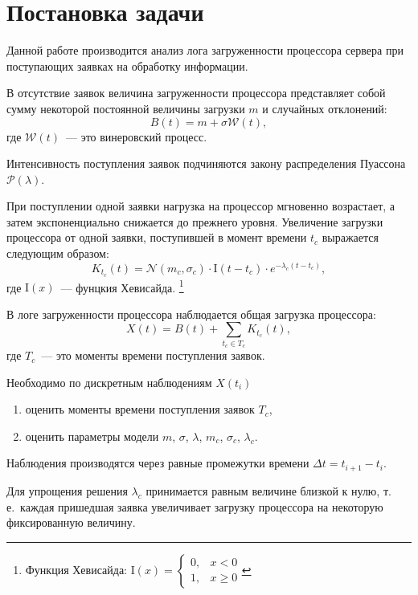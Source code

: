 \documentclass[a4paper,10pt]{article}
\begin{document}



\section{Постановка задачи}
Данной работе производится анализ лога загруженности процессора сервера
при поступающих заявках на обработку информации.

В отсутствие заявок величина загруженности процессора представляет собой 
сумму некоторой постоянной величины загрузки $m$ и случайных отклонений:
$$B(t) = m + \sigma \mathcal{W}(t),$$
где $\mathcal{W}(t)$~--- это винеровский процесс.

Интенсивность поступления заявок подчиняются закону
распределения Пуассона $\mathcal{P}(\lambda)$.

При поступлении одной заявки нагрузка на процессор мгновенно возрастает,
а затем экспоненциально снижается до прежнего уровня.
Увеличение загрузки процессора от одной заявки, 
поступившей в момент времени $t_c$ выражается следующим образом:
$$K_{t_c}(t) = \mathcal{N}(m_c, \sigma_c) \cdot \mathrm{I}(t - t_c) \cdot 
    e^{-\lambda_c(t - t_c)},$$
где $\mathrm{I}(x)$~--- фунцкия Хевисайда.%
\footnote{
Функция Хевисайда: $\mathrm{I}(x) = \left\{
  \begin{array}{rl}
    0, & x < 0 \\
    1, & x \geqslant 0
  \end{array}\right.$
}

В логе загруженности процессора наблюдается общая загрузка процессора:
$$X(t) = B(t) + \sum\limits_{t_c \in T_c}K_{t_c}(t),$$
где $T_c$~--- это моменты времени поступления заявок.

Необходимо по дискретным наблюдениям $X(t_i)$
\begin{enumerate}
 \item оценить моменты времени поступления заявок $T_c$,
 \item оценить параметры модели $m$, $\sigma$, $\lambda$, $m_c$, 
 $\sigma_c$, $\lambda_c$.
\end{enumerate}
Наблюдения производятся через равные промежутки времени 
$\Delta t = t_{i+1} - t_i.$

Для упрощения решения $\lambda_c$ принимается равным величине близкой к нулю,
т.\,е.~каждая пришедшая заявка увеличивает загрузку процессора на некоторую 
фиксированную величину.
\end{document}
